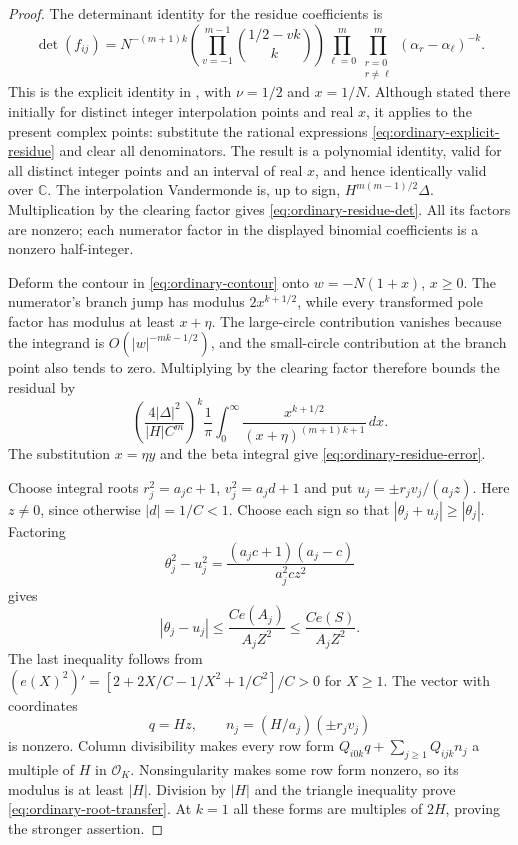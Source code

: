 \documentclass[12pt]{article}
\numberwithin{equation}{section}
\begin{document}
\begin{proof}
The determinant identity for the residue coefficients is
\[
 \det(f_{ij})=
 N^{-(m+1)k}
 \left(\prod_{v=-1}^{m-1}\binom{1/2-vk}{k}\right)
 \prod_{\ell=0}^m\prod_{\substack{r=0\\r\ne\ell}}^m
             (\alpha_r-\alpha_\ell)^{-k}.
\]
This is the explicit identity in \cite[p.~1721]{Bennett96}, with
$\nu=1/2$ and $x=1/N$.  Although stated there initially for distinct
integer interpolation points and real $x$, it applies to the present
complex points: substitute the rational expressions
\eqref{eq:ordinary-explicit-residue} and clear all denominators.  The
result is a polynomial identity, valid for all distinct integer points
and an interval of real $x$, and hence identically valid over
$\mathbb C$.  The interpolation Vandermonde is, up to sign,
$H^{m(m-1)/2}\Delta$.  Multiplication by the clearing factor gives
\eqref{eq:ordinary-residue-det}.  All its factors are nonzero; each
numerator factor in the displayed binomial coefficients is a nonzero
half-integer.

Deform the contour in \eqref{eq:ordinary-contour} onto
$w=-N(1+x)$, $x\ge0$.  The numerator's branch jump has modulus
$2x^{k+1/2}$, while every transformed pole factor has modulus at least
$x+\eta$.  The large-circle contribution vanishes because the
integrand is $O(|w|^{-mk-1/2})$, and the small-circle contribution at
the branch point also tends to zero.  Multiplying by the clearing
factor therefore bounds the residual by
\[
 \left(\frac{4|\Delta|^2}{|H|C^m}\right)^k\frac1\pi
 \int_0^\infty\frac{x^{k+1/2}}{(x+\eta)^{(m+1)k+1}}\,dx.
\]
The substitution $x=\eta y$ and the beta integral give
\eqref{eq:ordinary-residue-error}.

Choose integral roots $r_j^2=a_jc+1$, $v_j^2=a_jd+1$ and put
$u_j=\pm r_jv_j/(a_jz)$.  Here $z\ne0$, since otherwise
$|d|=1/C<1$.  Choose each sign so that
$|\theta_j+u_j|\ge|\theta_j|$.  Factoring
\[
 \theta_j^2-u_j^2
 =\frac{(a_jc+1)(a_j-c)}{a_j^2cz^2}
\]
gives
\[
 |\theta_j-u_j|\le\frac{Ce(A_j)}{A_jZ^2}
                 \le\frac{Ce(S)}{A_jZ^2}.
\]
The last inequality follows from
$(e(X)^2)'=[2+2X/C-1/X^2+1/C^2]/C>0$ for $X\ge1$.
The vector with coordinates
\[
 q=Hz,\qquad n_j=(H/a_j)(\pm r_jv_j)
\]
is nonzero.  Column divisibility makes every row form
$Q_{i0k}q+\sum_{j\ge1}Q_{ijk}n_j$ a multiple of $H$ in
$\mathcal O_K$.  Nonsingularity makes some row form nonzero, so its
modulus is at least $|H|$.  Division by $|H|$ and the triangle
inequality prove \eqref{eq:ordinary-root-transfer}.  At $k=1$ all
these forms are multiples of $2H$, proving the stronger assertion.
\end{proof}
\end{document}
